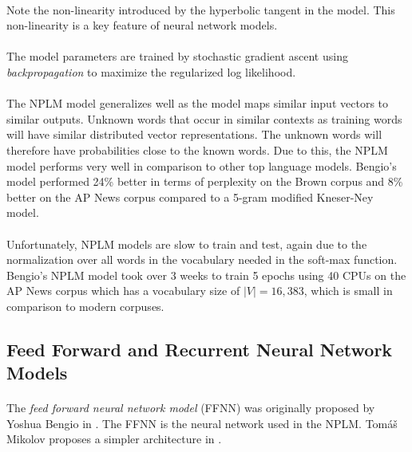 \paragraph{}
Note the non-linearity introduced by the hyperbolic tangent in the model. This non-linearity is a key feature of neural network models.
\paragraph{}
The model parameters are trained by stochastic gradient ascent using \emph{backpropagation} to maximize the regularized log likelihood. 
\paragraph{}
The NPLM model generalizes well as the model maps similar input vectors to similar outputs. Unknown words that occur in similar contexts as training words will have similar distributed vector representations. The unknown words will therefore have probabilities close to the known words.  Due to this, the NPLM model performs very well in comparison to other top language models. Bengio's model performed 24\% better in terms of perplexity on the Brown corpus and 8\% better on the AP News corpus compared to a 5-gram modified Kneser-Ney model.
\paragraph{}
Unfortunately, NPLM models are slow to train and test, again due to the normalization over all words in the vocabulary needed in the soft-max function. Bengio's NPLM model took over 3 weeks to train 5 epochs using 40 CPUs on the AP News corpus which has a vocabulary size of $|V|=16,383$, which is small in comparison to modern corpuses.

\subsection{Feed Forward and Recurrent Neural Network Models}
\paragraph{}
The \emph{feed forward neural network model} (FFNN) was originally proposed by Yoshua Bengio in \cite{Bengio2003}. The FFNN is the neural network used in the NPLM. Tom{\'a}\v{s} Mikolov proposes a simpler architecture in \cite{Mikolov2009}.


